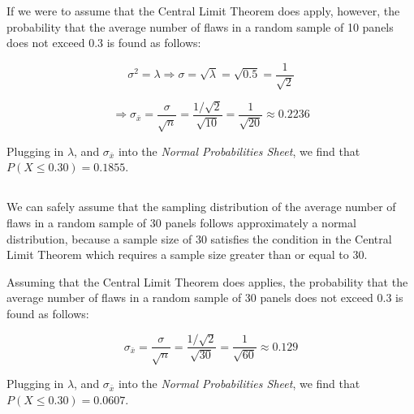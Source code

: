 \documentclass[letterpaper]{article}
\begin{document}
If we were to assume that the Central Limit Theorem does apply, however, the
probability that the average number of flaws in a random sample of 10 panels
does not exceed 0.3 is found as follows:

$$\sigma^2 = \lambda \Rightarrow
 \sigma = \sqrt{\lambda} = \sqrt{0.5} = \frac{1}{\sqrt{2}} $$

$$\Rightarrow \sigma_{\bar{x}} = \frac{\sigma}{\sqrt{n}} =
 \frac{1/\sqrt{2}}{\sqrt{10}} = \frac{1}{\sqrt{20}} \approx 0.2236 $$

Plugging in $\lambda$, and $\sigma_{\bar{x}}$ into the \textit{Normal Probabilities Sheet},
we find that $P(X \leq 0.30) = 0.1855$.

\subsection{}%
We can safely assume that the sampling distribution of the average number of
flaws in a random sample of 30 panels follows approximately a normal
distribution, because a sample size of 30 satisfies the condition in the Central
Limit Theorem which requires a sample size greater than or equal to 30.

Assuming that the Central Limit Theorem does applies, the
probability that the average number of flaws in a random sample of 30 panels
does not exceed 0.3 is found as follows:

$$\sigma_{\bar{x}} = \frac{\sigma}{\sqrt{n}} =
 \frac{1/\sqrt{2}}{\sqrt{30}} = \frac{1}{\sqrt{60}} \approx 0.129 $$

Plugging in $\lambda$, and $\sigma_{\bar{x}}$ into the \textit{Normal Probabilities Sheet},
we find that $P(X \leq 0.30) = 0.0607$.

\section{}%

\subsection{}%
\end{document}
